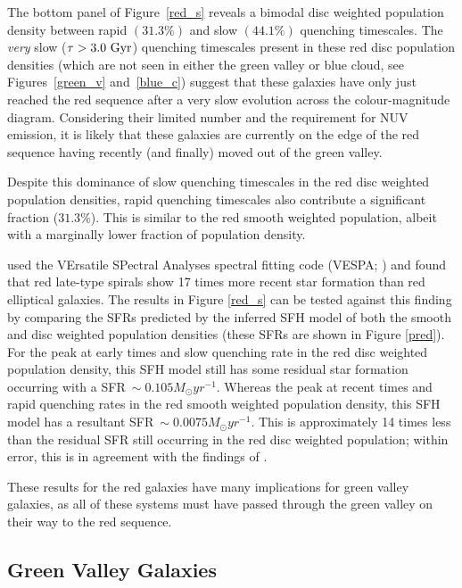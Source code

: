 The bottom panel of Figure~\ref{red_s} reveals a bimodal disc weighted population density between rapid $(31.3\%)$ and slow $(44.1\%)$ quenching timescales. The \emph{very} slow ($\tau > 3.0 ~\rm{Gyr}$) quenching timescales present in these red disc population densities (which are not seen in either the green valley or blue cloud, see Figures~\ref{green_v} and~\ref{blue_c}) suggest that these galaxies have only just reached the red sequence after a very slow evolution across the colour-magnitude diagram. Considering their limited number and the requirement for NUV emission, it is likely that these galaxies are currently on the edge of the red sequence having recently (and finally) moved out of the green valley. 

Despite this dominance of slow quenching timescales in the red disc weighted population densities, rapid quenching timescales also contribute a significant fraction ($31.3\%$). This is similar to the red smooth weighted population, albeit with a marginally lower fraction of population density. 

\citet{tojeiro13} used the VErsatile SPectral Analyses spectral fitting code (VESPA; \citealt{tojeiro07}) and found that red late-type spirals show 17 times more recent star formation than red elliptical galaxies. The results in Figure \ref{red_s} can be tested against this finding  by comparing the SFRs predicted by the inferred SFH model of both the smooth and disc weighted population densities (these SFRs are shown in Figure \ref{pred}). For the peak at early times and slow quenching rate in the red disc weighted population density, this SFH model still has some residual star formation occurring with a SFR$~\sim0.105 M_{\odot}yr^{-1}$. Whereas the peak at recent times and rapid quenching rates in the red smooth weighted population density, this SFH model has a resultant SFR$~\sim0.0075 M_{\odot}yr^{-1}$. This is approximately 14 times less than the residual SFR still occurring in the red disc weighted population; within error, this is in agreement with the findings of \citet{tojeiro13}. 

These results for the red galaxies have many implications for green valley galaxies, as all of these systems must have passed through the green valley on their way to the red sequence.


\subsection{Green Valley Galaxies}\label{gv}

